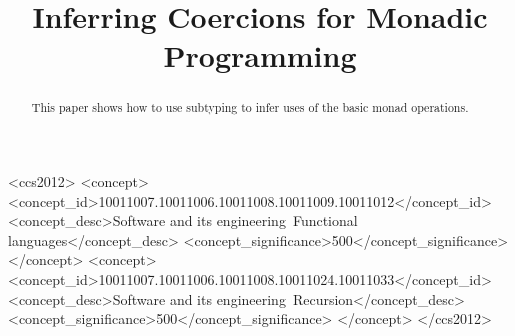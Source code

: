 \documentclass[acmsmall,screen,review]{acmart}
\begin{document}
\title{Inferring Coercions for Monadic Programming}






\renewcommand{\shortauthors}{\ }%

\begin{abstract}
  This paper shows how to use subtyping to infer uses of the basic
  monad operations.
\end{abstract}

\begin{CCSXML}
<ccs2012>
<concept>
<concept_id>10011007.10011006.10011008.10011009.10011012</concept_id>
<concept_desc>Software and its engineering~Functional languages</concept_desc>
<concept_significance>500</concept_significance>
</concept>
<concept>
<concept_id>10011007.10011006.10011008.10011024.10011033</concept_id>
<concept_desc>Software and its engineering~Recursion</concept_desc>
<concept_significance>500</concept_significance>
</concept>
</ccs2012>
\end{CCSXML}


\end{document}
